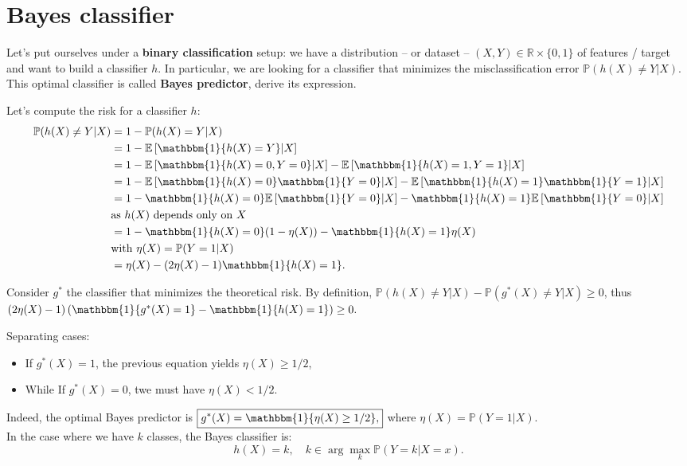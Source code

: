 \section{Bayes classifier}

\begin{tcolorbox}[width=\linewidth, sharp corners=all, colback=white!95!black]
Let's put ourselves under a \textbf{binary classification} setup: we have a distribution -- or dataset -- $(X, Y) \in \mathbb{R} \times \{0,1\}$ of features / target and want to build a classifier $h$.\newline
In particular, we are looking for a classifier that minimizes the misclassification error $\mathbb{P}(h(X) \neq Y \vert X)$. This optimal classifier is called \textbf{Bayes predictor}, derive its expression.

\end{tcolorbox}

Let's compute the risk for a classifier $h$:
\begin{align*}
    \mathbb{P}(h(X) \neq Y | X) &= 1 - \mathbb{P}(h(X) = Y | X)\\
    &= 1 - \mathbb{E}\left[\mathbbm{1}\{h(X) = Y\} | X\right]\\
    &= 1 - \mathbb{E}\left[\mathbbm{1}\{h(X)=0, Y=0\} | X\right] - \mathbb{E}\left[\mathbbm{1}\{h(X)=1, Y=1\} | X\right]\\
    &= 1 - \mathbb{E}\left[\mathbbm{1}\{h(X)=0\}\mathbbm{1}\{Y=0\} | X\right] - \mathbb{E}\left[\mathbbm{1}\{h(X)=1\}\mathbbm{1}\{Y=1\} | X\right]\\
    &= 1 - \mathbbm{1}\{h(X)=0\} \mathbb{E}\left[\mathbbm{1}\{Y=0\} | X\right] - \mathbbm{1}\{h(X)=1\} \mathbb{E}\left[\mathbbm{1}\{Y=0\} | X\right] \\ & \text{as $h(X)$ depends only on $X$}\\
    &= 1 - \mathbbm{1}\{h(X)=0\}(1-\eta(X)) - \mathbbm{1}\{h(X)=1\}\eta(X) \\ & \text{with $\eta(X) = \mathbb{P}(Y=1 | X)$}\\
    &= \eta(X) - (2\eta(X) - 1)\mathbbm{1}\{h(X)=1\}.
\end{align*}


Consider $g^{*}$ the classifier that minimizes the theoretical risk. By definition, $\mathbb{P}(h(X) \neq Y | X) - \mathbb{P}(g^{*}(X) \neq Y | X) \geq 0$, thus $(2\eta(X) - 1)\left(\mathbbm{1}\{g^{*}(X)=1\} - \mathbbm{1}\{h(X)=1\}\right) \geq 0.$

Separating cases:
\begin{itemize}
    \item If $g^{*}(X) = 1$, the previous equation yields $\eta(X) \geq 1/2$,
    \item While If $g^{*}(X) = 0$, twe must have $\eta(X) < 1/2$.
\end{itemize}

Indeed, the optimal Bayes predictor is $\boxed{g^{*}(X) = \mathbbm{1}\{\eta(X) \geq 1/2\},}$ where $\eta(X) = \mathbb{P}(Y=1 | X).$\\

\noindent In the case where we have $k$ classes, the Bayes classifier is: $$h(X) = k, \quad k \in \arg\max_{k}\mathbb{P}(Y=k|X=x).$$

